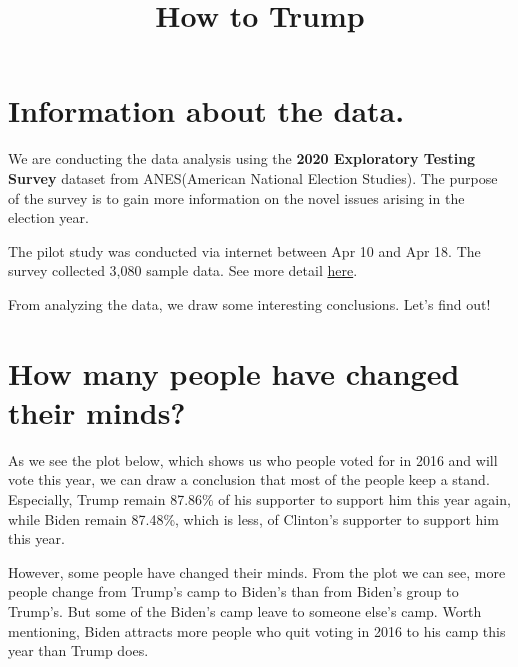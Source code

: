 \documentclass[
]{article}
\title{How to Trump}
\author{}
\date{\vspace{-2.5em}}
\begin{document}
\maketitle

\hypertarget{information-about-the-data.}{%
\section{Information about the
data.}\label{information-about-the-data.}}

We are conducting the data analysis using the \textbf{2020 Exploratory
Testing Survey} dataset from ANES(American National Election Studies).
The purpose of the survey is to gain more information on the novel
issues arising in the election year.

The pilot study was conducted via internet between Apr 10 and Apr 18.
The survey collected 3,080 sample data. See more detail
\href{https://electionstudies.org/data-center/2020-exploratory-testing-survey/}{here}.

From analyzing the data, we draw some interesting conclusions. Let's
find out!

\hypertarget{how-many-people-have-changed-their-minds}{%
\section{How many people have changed their
minds?}\label{how-many-people-have-changed-their-minds}}

As we see the plot below, which shows us who people voted for in 2016
and will vote this year, we can draw a conclusion that most of the
people keep a stand. Especially, Trump remain 87.86\% of his supporter
to support him this year again, while Biden remain 87.48\%, which is
less, of Clinton's supporter to support him this year.

However, some people have changed their minds. From the plot we can see,
more people change from Trump's camp to Biden's than from Biden's group
to Trump's. But some of the Biden's camp leave to someone else's camp.
Worth mentioning, Biden attracts more people who quit voting in 2016 to
his camp this year than Trump does.
\end{document}
